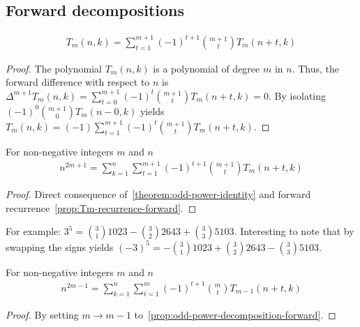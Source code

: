 \subsection{Forward decompositions}\label{subsec:forward-decompositions}
\begin{proposition}
    \label{prop:Tm-recurrence-forward}
    \begin{align*}
        T_{m} (n,k) = \sum_{t=1}^{m+1} (-1)^{t+1} \binom{m+1}{t} T_{m} (n+t, k)
    \end{align*}
    \begin{proof}
        The polynomial $T_{m} (n,k)$ is a polynomial of degree $m$ in $n$.
        Thus, the forward difference with respect to $n$ is
        $\Delta^{m+1} T_{m} (n, k) = \sum_{t=0}^{m+1} (-1)^{t} \binom{m+1}{t} T_{m} (n+t, k) = 0$.
        By isolating $(-1)^{0} \binom{m+1}{0} T_{m} (n-0, k)$ yields
        $T_{m} (n, k) = (-1) \sum_{t=1}^{m+1} (-1)^{t} \binom{m+1}{t} T_{m} (n+t, k)$.
    \end{proof}
\end{proposition}

\begin{proposition}
    \label{prop:odd-power-decomposition-forward}
    For non-negative integers $m$ and $n$
    \begin{align*}
        n^{2m+1} = \sum_{k=1}^{n} \sum_{t=1}^{m+1} (-1)^{t+1} \binom{m+1}{t} T_{m} (n+t, k)
    \end{align*}
    \begin{proof}
        Direct consequence of~\eqref{theorem:odd-power-identity}
        and forward recurrence~\eqref{prop:Tm-recurrence-forward}.
    \end{proof}
\end{proposition}
For example: $3^5 = \binom{3}{1} 1023 - \binom{3}{2} 2643 + \binom{3}{3} 5103$.
Interesting to note that by swapping the signs yields
$(-3)^5 = -\binom{3}{1} 1023 + \binom{3}{2} 2643 - \binom{3}{3} 5103$.

\begin{proposition}
    \label{prop:odd-power-decomposition-forward-m-1}
    For non-negative integers $m$ and $n$
    \begin{align*}
        n^{2m-1} = \sum_{k=1}^{n} \sum_{t=1}^{m} (-1)^{t+1} \binom{m}{t} T_{m-1} (n+t, k)
    \end{align*}
    \begin{proof}
        By setting $m \rightarrow m-1$ to~\eqref{prop:odd-power-decomposition-forward}.
    \end{proof}
\end{proposition}

